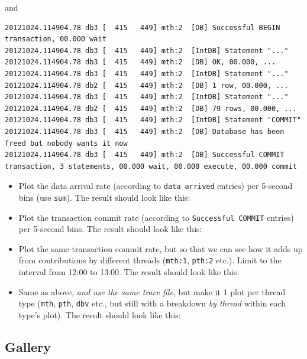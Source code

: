 \documentclass{article}
\begin{document}
and

\begin{verbatim}
20121024.114904.78 db3 [  415   449] mth:2  [DB] Successful BEGIN transaction, 00.000 wait
20121024.114904.78 db3 [  415   449] mth:2  [IntDB] Statement "..."
20121024.114904.78 db3 [  415   449] mth:2  [DB] OK, 00.000, ...
20121024.114904.78 db3 [  415   449] mth:2  [IntDB] Statement "..."
20121024.114904.78 db2 [  415   449] mth:2  [DB] 1 row, 00.000, ...
20121024.114904.78 db3 [  415   449] mth:2  [IntDB] Statement "..."
20121024.114904.78 db2 [  415   449] mth:2  [DB] 79 rows, 00.000, ...
20121024.114904.78 db3 [  415   449] mth:2  [IntDB] Statement "COMMIT"
20121024.114904.78 db3 [  415   449] mth:2  [DB] Database has been freed but nobody wants it now 
20121024.114904.78 db3 [  415   449] mth:2  [DB] Successful COMMIT transaction, 3 statements, 00.000 wait, 00.000 execute, 00.000 commit 
\end{verbatim}

\begin{itemize}
 \item Plot the data arrival rate (according to \verb|data arrived| entries) per 5-second bins (use \verb|sum|). The result should look like this: 
 \item Plot the transaction commit rate (according to \verb|Successful COMMIT| entries) per 5-second bins. The result should look like this: 
 \item Plot the same transaction commit rate, but so that we can see how it adds up from contributions by different threads (\verb|mth:1|, \verb|pth:2| etc.). Limit to the interval from 12:00 to 13:00. The result should look like this: 
 \item Same as above, \emph{and use the same trace file}, but make it 1 plot per thread type (\verb|mth|, \verb|pth|, \verb|dbv| etc., but still with a breakdown \emph{by thread} within each type's plot). The result should look like this: 
\end{itemize}

\pagebreak
\subsection{Gallery}
\label{sec:tplot-gallery}

\pagebreak
\end{document}
